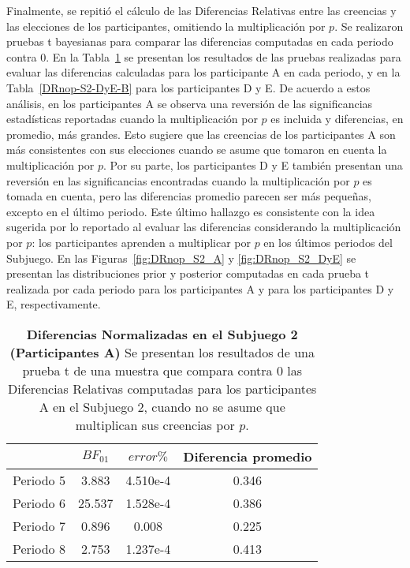 Finalmente, se repitió el cálculo de las Diferencias Relativas entre las creencias y las elecciones de los participantes, omitiendo la multiplicación por $p$. Se realizaron pruebas t bayesianas para comparar las diferencias computadas en cada periodo contra 0. En la Tabla~\ref{DRnop-S2-A-B} se presentan los resultados de las pruebas realizadas para evaluar las diferencias calculadas para los participante A en cada periodo, y en la Tabla~\ref{DRnop-S2-DyE-B} para los participantes D y E. De acuerdo a estos análisis, en los participantes A se observa una reversión de las significancias estadísticas reportadas cuando la multiplicación por $p$ es incluida y diferencias, en promedio, más grandes. Esto sugiere que las creencias de los participantes A son más consistentes con sus elecciones cuando se asume que tomaron en cuenta la multiplicación por $p$. Por su parte, los participantes D y E también presentan una reversión en las significancias encontradas cuando la multiplicación por $p$ es tomada en cuenta, pero las diferencias promedio parecen ser más pequeñas, excepto en el último periodo. Este último hallazgo es consistente con la idea sugerida por lo reportado al evaluar las diferencias considerando la multiplicación por $p$: los participantes aprenden a multiplicar por $p$ en los últimos periodos del Subjuego. En las Figuras~\ref{fig:DRnop_S2_A} y \ref{fig:DRnop_S2_DyE} se presentan las distribuciones prior y posterior computadas en cada prueba t realizada por cada periodo para los participantes A y para los participantes D y E, respectivamente.\\


\begin{table}[h]
\caption[Diferencias Relativas en el Subjuego 2, omitiendo la multiplicación por $p$; Participantes A (Pruebas t de una muestra)]{\textbf{Diferencias Normalizadas en el Subjuego 2 (Participantes A)} Se presentan los resultados de una prueba t de una muestra que compara contra 0 las Diferencias Relativas computadas para los participantes A en el Subjuego 2, cuando no se asume que multiplican sus creencias por $p$.}
\label{DRnop-S2-A-B}
\centering
\begin{tabular}{l | c c | c}
\toprule
\textbf{} & \textbf{$BF_{01}$} & \textbf{$error\%$} & \textbf{Diferencia promedio}\\
\midrule
Periodo 5 & 3.883 & 4.510e-4 & 0.346\\
Periodo 6 & 25.537 & 1.528e-4 & 0.386\\
Periodo 7 & 0.896 & 0.008 & 0.225\\
Periodo 8 & 2.753 & 1.237e-4 & 0.413\\
\bottomrule
\end{tabular}
\end{table}


